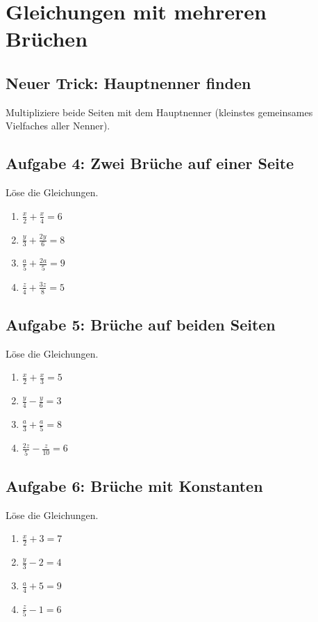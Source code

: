 \documentclass[12pt]{article}
\begin{document}
\section*{Gleichungen mit mehreren Brüchen}

\subsection*{Neuer Trick: Hauptnenner finden}
Multipliziere beide Seiten mit dem Hauptnenner (kleinstes gemeinsames Vielfaches aller Nenner).

\subsection*{Aufgabe 4: Zwei Brüche auf einer Seite}
Löse die Gleichungen.
\begin{enumerate}
  \item \(\frac{x}{2} + \frac{x}{4} = 6\)
  \item \(\frac{y}{3} + \frac{2y}{6} = 8\)
  \item \(\frac{a}{5} + \frac{2a}{5} = 9\)
  \item \(\frac{z}{4} + \frac{3z}{8} = 5\)
\end{enumerate}

\subsection*{Aufgabe 5: Brüche auf beiden Seiten}
Löse die Gleichungen.
\begin{enumerate}
  \item \(\frac{x}{2} + \frac{x}{3} = 5\)
  \item \(\frac{y}{4} - \frac{y}{6} = 3\)
  \item \(\frac{a}{3} + \frac{a}{5} = 8\)
  \item \(\frac{2z}{5} - \frac{z}{10} = 6\)
\end{enumerate}

\subsection*{Aufgabe 6: Brüche mit Konstanten}
Löse die Gleichungen.
\begin{enumerate}
  \item \(\frac{x}{2} + 3 = 7\)
  \item \(\frac{y}{3} - 2 = 4\)
  \item \(\frac{a}{4} + 5 = 9\)
  \item \(\frac{z}{5} - 1 = 6\)
\end{enumerate}
\end{document}
